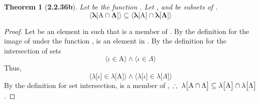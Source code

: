 \documentclass[preview]{standalone}
\newtheorem*{theorem*}{Theorem}
\begin{document}
\begin{theorem*}[\textbf{2.2.36b}]
    Let \bm{$\lambda$} be the function 
    \bm{$\lambda : \Gamma \rightarrow \Delta$}. 
    Let , 
    and \bm{$\Lambda$} be subsets of \bm{$\Gamma$}.
    \begin{equation*}
        \bm{
            \Big \langle \lambda \big[ \mathrm{A} \cap \Lambda \big] \Big \rangle
                \subseteq 
            \Big \langle \lambda \big[ \mathrm{A} \big] \cap \lambda \big[ \Lambda \big] \Big \rangle
        }
    \end{equation*}
\end{theorem*}

\begin{proof}
    Let \bm{$\iota$} be an element in \bm{$\Gamma$} such that 
    \bm{$\lambda \big[ \iota \big]$} is a member of 
    . 
    By the definition for the image of 
    under the function \bm{$\lambda$}, 
    \bm{$\iota$} is an element in 
    . 
    By the definition for the
    intersection of sets 
    \begin{equation*}
        \Big \langle \iota \in \mathrm{A} \Big \rangle 
            \land 
        \Big \langle \iota \in \Lambda \Big \rangle
    \end{equation*}
    Thus,
    \begin{equation*}
        \Big \langle 
            \lambda \big[ \iota \big] 
                \in 
            \lambda \big[ \mathrm{A} \big]
        \Big \rangle 
            \land 
        \Big \langle
            \lambda \big[ \iota \big] 
                \in 
            \lambda \big[ \Lambda \big]
        \Big \rangle
    \end{equation*} 
    By the definition for set intersection,
    \bm{$\lambda \big[ \iota \big]$} is a member of
    ,
    $\therefore \text{\space} \relax{
        \lambda \big[ \mathrm{A} \cap \Lambda \big] 
            \subseteq 
        \lambda \big[ \mathrm{A} \big] \cap \lambda \big[ \Lambda \big]
    }$.
\color{lightgray} \end{proof}
\end{document}
